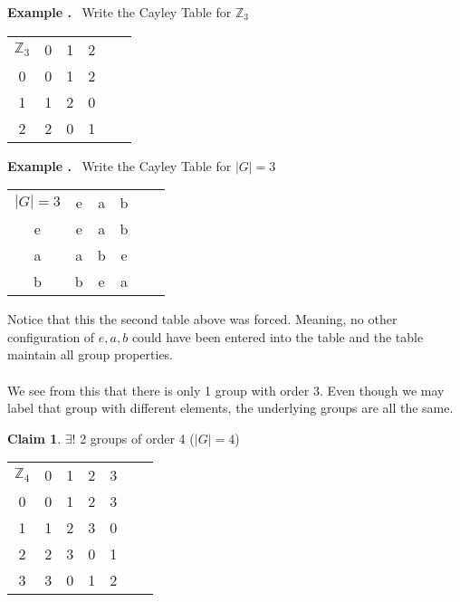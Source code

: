 \documentclass{article}
\newcounter{example}
\newcounter{claim}
\newcounter{solution}
\theoremstyle{definition}
\theoremstyle{claim}
\newtheorem{claim}{Claim}[section]
\theoremstyle{remark}
\theoremstyle{theorem}
\newcommand\Example{%
  \stepcounter{example}%
  \textbf{Example \theexample.}~%
  \setcounter{solution}{0}%
}
\begin{document}
\begin{flushleft}
\Example Write the Cayley Table for $\mathbb{Z}_{3}$\\
 \begin{center}
\setlength\extrarowheight{3pt}
\begin{tabular}{c | c c c c c}
    $\mathbb{Z}_{3}$ & 0 & 1 & 2  \\
    \cline{1-4}
    0 & 0 & 1 & 2  \\
    1 & 1 & 2 & 0  \\
    2 & 2 & 0 & 1  \\
\end{tabular}
\end{center}

\Example Write the Cayley Table for $|G|=3$\\
 \begin{center}

\setlength\extrarowheight{3pt}
\begin{tabular}{c | c c c c c}
    $|G|=3$ & e & a & b  \\
    \cline{1-4}
    e & e & a & b  \\
    a & a & b & e  \\
    b & b & e & a  \\
\end{tabular}
\end{center}
Notice that this the second table above was forced. Meaning, no other configuration of $e,a,b$ could have been entered into the table and the table maintain all group properties.\\\\
We see from this that there is only 1 group with order 3. Even though we may label that group with different elements, the underlying groups are all the same.

\begin{claim}{}
$\exists$! 2 groups of order 4 ($|G|=4$)
\end{claim}

\begin{center}
\setlength\extrarowheight{3pt}
\begin{tabular}{c | c c c c c c}
    $\mathbb{Z}_{4}$ & 0 & 1 & 2 & 3  \\
    \cline{1-5}
    0 & 0 & 1 & 2 & 3  \\
    1 & 1 & 2 & 3 & 0 	\\
    2 & 2 & 3 & 0 & 1	\\
    3 & 3 & 0 & 1 & 2	\\
\end{tabular}
\end{center}


\end{flushleft}
\end{document}
